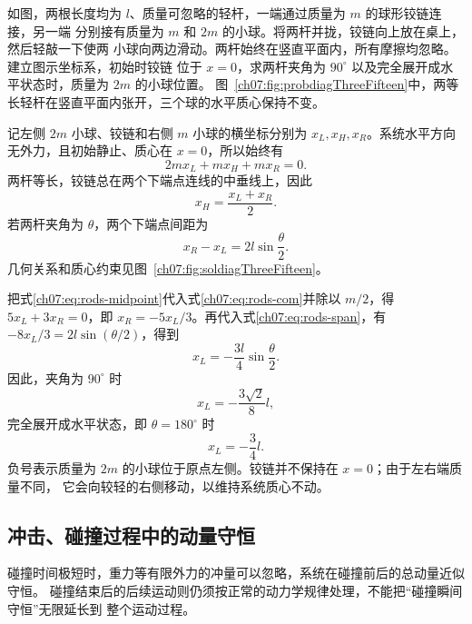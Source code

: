{
\begin{origexamplebox}{}\label{ch07:ex:s08-3-15}
如图，两根长度均为 $l$、质量可忽略的轻杆，一端通过质量为 $m$ 的球形铰链连接，另一端
分别接有质量为 $m$ 和 $2m$ 的小球。将两杆并拢，铰链向上放在桌上，然后轻敲一下使两
小球向两边滑动。两杆始终在竖直平面内，所有摩擦均忽略。建立图示坐标系，初始时铰链
位于 $x=0$，求两杆夹角为 $90^\circ$ 以及完全展开成水平状态时，质量为 $2m$ 的小球位置。
图~\ref{ch07:fig:probdiagThreeFifteen}中，两等长轻杆在竖直平面内张开，三个球的水平质心保持不变。
\probdiagThreeFifteen
\end{origexamplebox}

\begin{xesolution}
记左侧 $2m$ 小球、铰链和右侧 $m$ 小球的横坐标分别为 $x_L,x_H,x_R$。系统水平方向
无外力，且初始静止、质心在 $x=0$，所以始终有
\begin{equation}\label{ch07:eq:rods-com}
 2m x_L+m x_H+m x_R=0.
\end{equation}
两杆等长，铰链总在两个下端点连线的中垂线上，因此
\begin{equation}\label{ch07:eq:rods-midpoint}
 x_H=\frac{x_L+x_R}{2}.
\end{equation}
若两杆夹角为 $\theta$，两个下端点间距为
\begin{equation}\label{ch07:eq:rods-span}
 x_R-x_L=2l\sin\frac{\theta}{2}.
\end{equation}
几何关系和质心约束见图~\ref{ch07:fig:soldiagThreeFifteen}。

\soldiagThreeFifteen
把式\eqref{ch07:eq:rods-midpoint}代入式\eqref{ch07:eq:rods-com}并除以 $m/2$，得
$5x_L+3x_R=0$，即 $x_R=-5x_L/3$。再代入式\eqref{ch07:eq:rods-span}，有
$-8x_L/3=2l\sin(\theta/2)$，得到
\[
 x_L=-\frac{3l}{4}\sin\frac{\theta}{2}.
\]
因此，夹角为 $90^\circ$ 时
\[
 \boxed{x_L=-\frac{3\sqrt2}{8}l},
\]
完全展开成水平状态，即 $\theta=180^\circ$ 时
\[
 \boxed{x_L=-\frac34l}.
\]
负号表示质量为 $2m$ 的小球位于原点左侧。铰链并不保持在 $x=0$；由于左右端质量不同，
它会向较轻的右侧移动，以维持系统质心不动。
\end{xesolution}

\subsection{冲击、碰撞过程中的动量守恒}

碰撞时间极短时，重力等有限外力的冲量可以忽略，系统在碰撞前后的总动量近似守恒。
碰撞结束后的后续运动则仍须按正常的动力学规律处理，不能把“碰撞瞬间守恒”无限延长到
整个运动过程。

}

